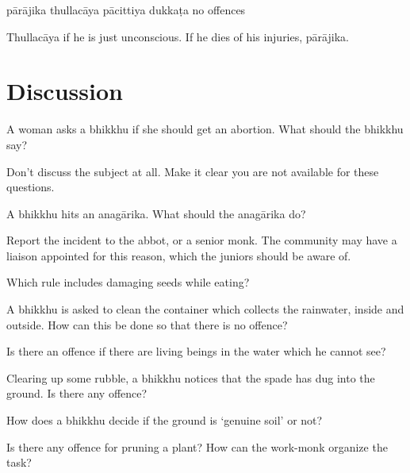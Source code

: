 \begin{exam}{\autoExamName}
\begin{problem*}
\begin{parts}
  \bigskip

  \begin{answers}{5}
    \bChoices
     pārājika\eAns
     thullacāya\eAns
     pācittiya\eAns
     dukkaṭa\eAns
     no offences\eAns
    \eChoices
  \end{answers}

  \begin{solution}
    Thullacāya if he is just unconscious. If he dies of his injuries, pārājika.
  \end{solution}

\end{parts}

\end{problem*}

\end{exam}

\section*{Discussion}

A woman asks a bhikkhu if she should get an abortion. What should the bhikkhu say?

\begin{solution}
  Don't discuss the subject at all. Make it clear you are not available for these questions.
\end{solution}

\bigskip

A bhikkhu hits an anagārika. What should the anagārika do?

\begin{solution}
  Report the incident to the abbot, or a senior monk.
  The community may have a liaison appointed for this reason,
  which the juniors should be aware of.
\end{solution}

\bigskip

Which rule includes damaging seeds while eating?

\bigskip

A bhikkhu is asked to clean the container which collects the rainwater, inside and outside.
How can this be done so that there is no offence?

\bigskip

Is there an offence if there are living beings in the water which he cannot see?

\bigskip

Clearing up some rubble, a bhikkhu notices that the spade has dug into the ground. Is there any offence?

\bigskip

How does a bhikkhu decide if the ground is `genuine soil' or not?

\bigskip

Is there any offence for pruning a plant? How can the work-monk organize the task?

